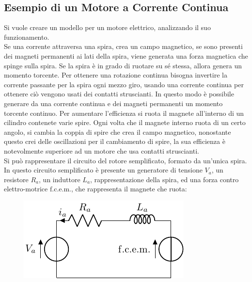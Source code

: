 \documentclass{article}
\numberwithin{equation}{subsection}
\begin{document}
\subsection{Esempio di un Motore a Corrente Continua}
Si vuole creare un modello per un motore elettrico, analizzando il suo funzionamento. \\
Se una corrente attraversa una spira, crea un campo magnetico, se sono 
presenti dei magneti permanenti ai lati della spira, viene generata una forza magnetica che spinge sulla spira. Se la spira è in grado di ruotare su sé stessa, allora genera 
un momento torcente. Per ottenere una rotazione continua bisogna invertire la corrente passante per la spira ogni mezzo giro, usando una corrente continua per ottenere ciò 
vengono usati dei contatti struscianti. In questo modo è possibile generare 
da una corrente continua e dei magneti permanenti un momento torcente continuo. Per aumentare l'efficienza si ruota il magnete all'interno di un cilindro contenete varie 
spire. Ogni volta che il magnete interno ruota di un certo angolo, si cambia la coppia di spire che crea il campo magnetico, nonostante questo crei delle oscillazioni per 
il cambiamento di spire, la sua efficienza è notevolmente superiore ad un motore che usa contatti struscianti. \\
Si può rappresentare il circuito del rotore semplificato, formato da un'unica spira. In questo circuito semplificato è presente un generatore di tensione $V_a$, 
un resistore $R_a$, un induttore $L_a$, rappresentazione della spira, ed una forza contro elettro-motrice $\mathrm{f.c.e.m.}$, che rappresenta il magnete che ruota:
\begin{figure}[H]%
    \centering
    \includegraphics{motore-corrente-continua.pdf}%
\end{figure}
\end{document}
